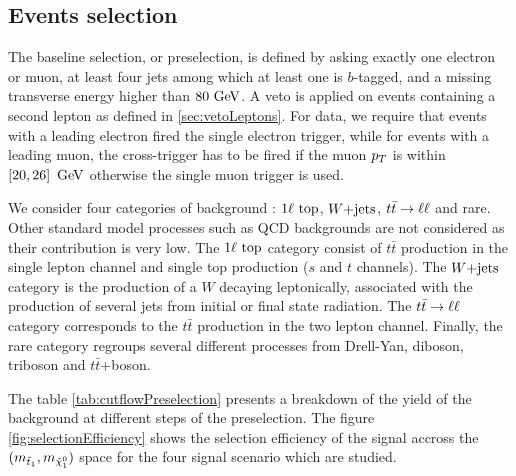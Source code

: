         \subsection{Events selection}

        The baseline selection, or preselection, is defined by asking exactly one electron or muon, at least 
        four jets among which at least one is $b$-tagged, and a missing transverse energy higher than $80 ~\text{GeV}$.
        A veto is applied on events containing a second lepton as defined in \ref{sec:vetoLeptons}.
        For data, we require that events with a leading electron fired the single electron 
        trigger, while for events with a leading muon, the cross-trigger has to be fired 
        if the muon $p_T$ is within $\left[ 20, 26 \right] ~\text{GeV}$ otherwise the single muon 
        trigger is used.

        We consider four categories of background : $1\ell~\text{top}$, $\text{$W$+jets}$, $t\bar{t} \rightarrow \ell \ell$ and rare. Other standard
        model processes such as QCD backgrounds are not considered as their contribution is very low. The $1\ell~\text{top}$
        category consist of $t\bar{t}$ production in the single lepton channel and single top production ($s$ and $t$ channels).
        The $\text{$W$+jets}$ category is the production of a $W$ decaying leptonically, associated with the production of several
        jets from initial or final state radiation. The $t\bar{t} \rightarrow \ell \ell$ category corresponds to the $t\bar{t}$ production
        in the two lepton channel. Finally, the rare category regroups several different processes from Drell-Yan, diboson,
        triboson and $t\bar{t}$+boson.

        The table \ref{tab:cutflowPreselection} presents a breakdown of the yield of the background at different steps of the
        preselection. The figure \ref{fig:selectionEfficiency} shows the selection efficiency of the signal accross the $(m_{\tilde{t}_1},
        m_{\tilde{\chi}_1^0})$ space for the four signal scenario which are studied. 

